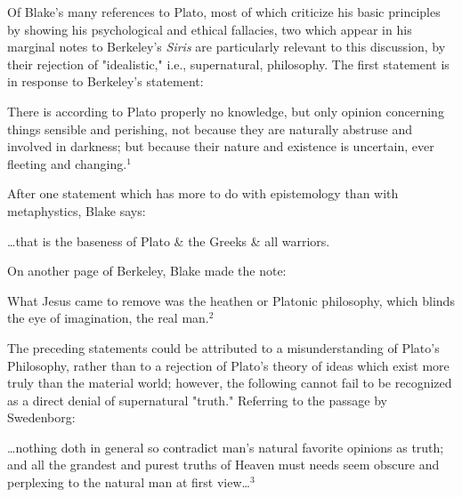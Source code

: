 Of Blake's many references to Plato, most of which criticize his basic principles by showing his psychological
and ethical fallacies, two which appear in his marginal notes to Berkeley's \textit{Siris} are particularly
relevant to this discussion, by their rejection of "idealistic," i.e., supernatural, philosophy. The first statement
is in response to Berkeley's statement:\par
\begin{center}
	\parbox{0.8\textwidth}{
		\hspace*{5mm}There is according to Plato properly no knowledge, but only opinion concerning
		things sensible and perishing, not because they are naturally abstruse and involved in 
		darkness; but because their nature and existence is uncertain, ever fleeting and changing.$^{1}$\par
	}%
\end{center}
\hspace*{5mm}After one statement which has more to do with epistemology than with metaphystics, Blake says:\par
\begin{center}
	\parbox{0.8\textwidth}{
		\centering
		\hspace*{5mm}\dots that is the baseness of Plato \& the Greeks \& all warriors.\par
	}%
\end{center}
\hspace*{5mm}On another page of Berkeley, Blake made the note:\par
\begin{center}
	\parbox{0.8\textwidth}{
		\hspace*{5mm}What Jesus came to remove was the heathen or Platonic philosophy,
		which blinds the eye of imagination, the real man.$^{2}$
	}%
\end{center}
\hspace*{5mm}The preceding statements could be attributed to a misunderstanding of Plato's Philosophy, rather than to a rejection
of Plato's theory of ideas which exist more truly than the material world; however, the following cannot fail to be 
recognized as a direct denial of supernatural "truth." Referring to the passage by Swedenborg:\par
\begin{center}
	\parbox{0.8\textwidth}{
		\hspace*{5mm}\dots nothing doth in general so contradict man's natural favorite
		opinions as truth; and all the grandest and purest truths of Heaven must needs seem
		obscure and perplexing to the natural man at first view\dots$^{3}$
	}%
\end{center}
